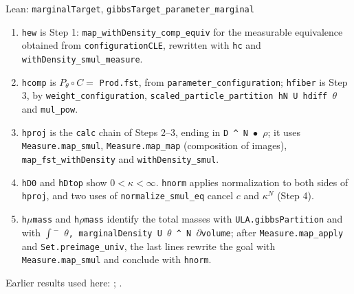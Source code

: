 \documentclass[11pt,a4paper]{article}
\begin{document}
\begin{leanbox}{Lean: \texttt{marginalTarget}, \texttt{gibbsTarget\_\allowbreak{}parameter\_\allowbreak{}marginal}}
\begin{enumerate}


\item \texttt{hew} is Step 1: \texttt{map\_\allowbreak{}with\allowbreak{}Density\_\allowbreak{}comp\_\allowbreak{}equiv} for the measurable equivalence obtained from \texttt{configuration\allowbreak{}CLE}, rewritten with \texttt{hc} and \texttt{with\allowbreak{}Density\_\allowbreak{}smul\_\allowbreak{}measure}.

\item \texttt{hcomp} is \(P_\theta\circ C=\) \texttt{Prod.\allowbreak{}fst}, from \texttt{parameter\_\allowbreak{}configuration}; \texttt{hfiber} is Step 3, by \texttt{weight\_\allowbreak{}configuration}, \texttt{scaled\_\allowbreak{}particle\_\allowbreak{}partition h\allowbreak{}N U hdiff \ensuremath{\theta}} and \texttt{mul\_\allowbreak{}pow}.

\item \texttt{hproj} is the \texttt{calc} chain of Steps 2–3, ending in \texttt{D \textasciicircum{} N \ensuremath{\bullet} \ensuremath{\rho}}; it uses \texttt{Measure.\allowbreak{}map\_\allowbreak{}smul}, \texttt{Measure.\allowbreak{}map\_\allowbreak{}map} (composition of images), \texttt{map\_\allowbreak{}fst\_\allowbreak{}with\allowbreak{}Density} and \texttt{with\allowbreak{}Density\_\allowbreak{}smul}.

\item \texttt{h\allowbreak{}D0} and \texttt{h\allowbreak{}Dtop} show \(0<\kappa<\infty\). \texttt{hnorm} applies normalization to both sides of \texttt{hproj}, and two uses of \texttt{normalize\_\allowbreak{}smul\_\allowbreak{}eq} cancel \(c\) and \(\kappa^N\) (Step 4).

\item \texttt{h\ensuremath{\mu}mass} and \texttt{h\ensuremath{\rho}mass} identify the total masses with \texttt{ULA.\allowbreak{}gibbs\allowbreak{}Partition} and with \texttt{\ensuremath{\int}\ensuremath{{}^{-}} \ensuremath{\theta}, marginal\allowbreak{}Density U \ensuremath{\theta} \textasciicircum{} N \ensuremath{\partial}volume}; after \texttt{Measure.\allowbreak{}map\_\allowbreak{}apply} and \texttt{Set.\allowbreak{}preimage\_\allowbreak{}univ}, the last lines rewrite the goal with \texttt{Measure.\allowbreak{}map\_\allowbreak{}smul} and conclude with \texttt{hnorm}.

\end{enumerate}
\end{leanbox}


Earlier results used here: \cite[Section~3.26.1]{LangevinLean2026ULASC}; \cite[Section~3.26.2]{LangevinLean2026ULASC}.
\end{document}

